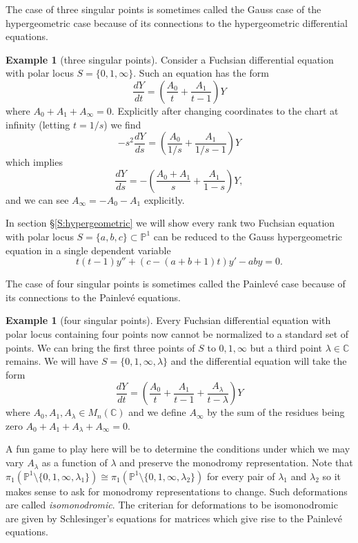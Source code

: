 \documentclass[]{book}
\numberwithin{equation}{section}
\theoremstyle{definition}
\newtheorem{example}[theorem]{Example}
\theoremstyle{remark}
\newcommand{\CC}{\mathbb{C}}
\newcommand{\PP}{\mathbb{P}}
\begin{document}
The case of three singular points is sometimes called the Gauss case of the hypergeometric case because of its connections to the hypergeometric differential equations.
\begin{example}[three singular points]
	Consider a Fuchsian differential equation with polar locus $S= \lbrace 0, 1,\infty\rbrace$. 
	Such an equation has the form
	 $$ \frac{dY}{dt} = \left ( \frac{A_0}{t} + \frac{A_1}{t-1}\right) Y$$
	where $A_0 + A_1 + A_{\infty} =0$.
	Explicitly after changing coordinates to the chart at infinity (letting $t=1/s$) we find
	 $$ -s^2 \dfrac{dY}{ds} = \left ( \frac{A_0}{1/s} + \frac{A_1}{1/s-1}\right) Y $$
	which implies 
	 $$ \dfrac{dY}{ds} =- \left ( \frac{A_0+A_1}{s} + \frac{A_1}{1-s}\right) Y,$$
	and we can see $A_{\infty} = -A_0-A_1$ explicitly. 
	
	In section \S\ref{S:hypergeometric} we will show every rank two Fuchsian equation with polar locus $S=\lbrace a,b,c\rbrace \subset \PP^1$ can be reduced to the Gauss hypergeometric equation in a single dependent variable 
	$$ t(t-1)y'' +(c-(a+b+1)t)y'-aby =0.$$
\end{example}

The case of four singular points is sometimes called the Painlev\'e case because of its connections to the Painlev\'e equations.
\begin{example}[four singular points]
	Every Fuchsian differential equation with polar locus containing four points now cannot be normalized to a standard set of points.
	We can bring the first three points of $S$ to $0,1,\infty$ but a third point $\lambda\in \CC$ remains. 
	We will have $S=\lbrace 0,1,\infty, \lambda\rbrace$ and the differential equation will take the form 
	 $$ \dfrac{dY}{dt} = \left( \frac{A_0}{t} + \frac{A_1}{t-1} + \frac{A_{\lambda}}{t-\lambda}\right) Y $$
	where $A_0,A_1,A_{\lambda}\in M_n(\CC)$ and we define $A_{\infty}$ by the sum of the residues being zero $A_0+A_1+A_{\lambda}+A_{\infty}=0$. 
	
	A fun game to play here will be to determine the conditions under which we may vary $A_{\lambda}$ as a function of $\lambda$ and preserve the monodromy representation. 
	Note that $\pi_1(\PP^1\setminus \lbrace 0,1,\infty,\lambda_1\rbrace) \cong \pi_1(\PP^1\setminus \lbrace 0,1,\infty,\lambda_2\rbrace)$ for every pair of $\lambda_1$ and $\lambda_2$ so it makes sense to ask for monodromy representations to change. 
	Such deformations are called \emph{isomonodromic}.
	The criterian for deformations to be isomonodromic are given by Schlesinger's equations for matrices which give rise to the Painlev\'e equations. 
\end{example}
\end{document}
